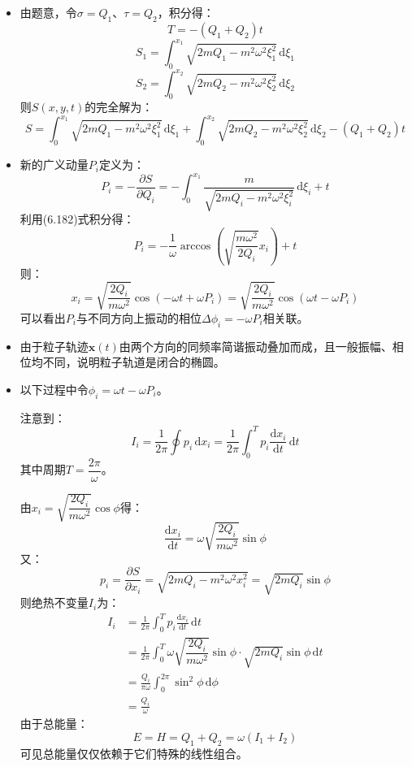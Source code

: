\documentclass[a4paper,fontset=windows]{ctexart}
\begin{document}
\begin{itemize}
        \item[3.(c)]
        由题意，令$\sigma = Q_1$、$\tau = Q_2$，积分得：
        \[
        T = -(Q_1 + Q_2)t
        \]
        \[
        S_1 = \int_{0}^{x_1}\sqrt{2mQ_1 - m^2 \omega^2 \xi_1^2}\,\mathrm{d}\xi_1
        \]
        \[
        S_2 = \int_{0}^{x_2}\sqrt{2mQ_2 - m^2 \omega^2 \xi_2^2}\,\mathrm{d}\xi_2
        \]
        则$S(x,y,t)$的完全解为：
        \[
        S = \int_{0}^{x_1}\sqrt{2mQ_1 - m^2 \omega^2 \xi_1^2}\,\mathrm{d}\xi_1 + \int_{0}^{x_2}\sqrt{2mQ_2 - m^2 \omega^2 \xi_2^2}\,\mathrm{d}\xi_2 - (Q_1 + Q_2)t
        \]
        \medskip

        \item[3.(d)]
        新的广义动量$P_i$定义为：
        \[
        P_i = -\frac{\partial S}{\partial Q_i} = -\int_{0}^{x_1}\frac{m}{\sqrt{2mQ_i - m^2 \omega^2 \xi_i^2}}\,\mathrm{d}\xi_i + t
        \]
        利用(6.182)式积分得：
        \[
        P_i = -\frac{1}{\omega}\arccos\left(\sqrt{\frac{m\omega^2}{2Q_i}}x_i\right) + t
        \]
        则：
        \[
        x_i = \sqrt{\frac{2Q_i}{m\omega^2}}\cos(-\omega t + \omega P_i) = \sqrt{\frac{2Q_i}{m\omega^2}}\cos(\omega t - \omega P_i)
        \]
        可以看出$P_i$与不同方向上振动的相位$\Delta\phi_i = -\omega P_i$相关联。
        \medskip

        \item[3.(e)]
        由于粒子轨迹$\bm{x}(t)$由两个方向的同频率简谐振动叠加而成，且一般振幅、相位均不同，说明粒子轨道是闭合的椭圆。
        \medskip

        \item[3.(f)]
        以下过程中令$\phi_i = \omega t - \omega P_i$。

        注意到：
        \[
        I_i = \frac{1}{2\pi}\oint p_i \,\mathrm{d}x_i = \frac{1}{2\pi}\int_0^T p_i \frac{\mathrm{d}x_i}{\mathrm{d}t}\,\mathrm{d}t
        \]
        其中周期$T = \dfrac{2\pi}{\omega}$。

        由$x_i = \sqrt{\dfrac{2Q_i}{m\omega^2}}\cos\phi$得：
        \[
        \frac{\mathrm{d}x_i}{\mathrm{d}t} = \omega\sqrt{\dfrac{2Q_i}{m\omega^2}}\sin\phi
        \]
        又：
        \[
        p_i = \frac{\partial S}{\partial x_i} = \sqrt{2mQ_i - m^2 \omega^2 x_i^2} = \sqrt{2mQ_i}\sin\phi
        \]
        则绝热不变量$I_i$为：
        \begin{align*}
            I_i
            &= \frac{1}{2\pi}\int_0^T p_i \frac{\mathrm{d}x_i}{\mathrm{d}t}\,\mathrm{d}t \\
            &= \frac{1}{2\pi}\int_0^T \omega\sqrt{\dfrac{2Q_i}{m\omega^2}}\sin\phi \cdot \sqrt{2mQ_i}\sin\phi \,\mathrm{d}t \\
            &= \frac{Q_i}{\pi\omega}\int_0^{2\pi} \sin^2\phi \,\mathrm{d}\phi \\
            &= \frac{Q_i}{\omega}
        \end{align*}
        由于总能量：
        \[
        E = H = Q_1 + Q_2 = \omega(I_1 + I_2)
        \]
        可见总能量仅仅依赖于它们特殊的线性组合。


\end{itemize}
\end{document}
